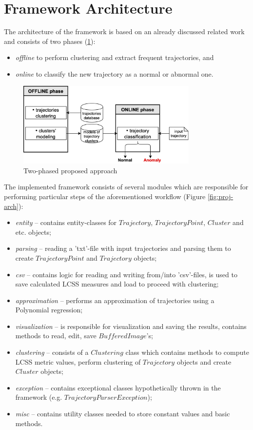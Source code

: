 \section{Framework Architecture}

The architecture of the framework is based on an already discussed related work \cite{inproceedings:7_related_work} and consists of two phases (\ref{fig:str}):

\begin{itemize}
	\item \textit{offline} to perform clustering and extract frequent trajectories, and
	\item \textit{online} to classify the new trajectory as a normal or abnormal one.
\end{itemize}

\begin{figure}[!htb]
	\centering{}
	\includegraphics[width=0.8\textwidth]{images/str.png}
	\caption{Two-phased proposed approach}
	\label{fig:str}
\end{figure}

The implemented framework consists of several modules which are responsible for performing particular steps of the aforementioned workflow (Figure \ref{fig:proj-arch}):
\begin{itemize}
	\setlength\itemsep{-0.2em}
	\item \textit{entity} -- contains entity-classes for $Trajectory$, $TrajectoryPoint$, $Cluster$ and etc. objects;
	\item \textit{parsing} -- reading a 'txt'-file with input trajectories and parsing them to create $TrajectoryPoint$ and $Trajectory$ objects;
	\item \textit{csv} -- contains logic for reading and writing from/into 'csv'-files, is used to save calculated LCSS measures and load to proceed with clustering;
	\item \textit{approximation} -- performs an approximation of trajectories using a Polynomial regression;
	\item \textit{visualization} -- is responsible for visualization and saving the results, contains methods to read, edit, save $BufferedImage$'s;
	\item \textit{clustering} -- consists of a $Clustering$ class which contains methods to compute LCSS metric values, perform clustering of $Trajectory$ objects and create $Cluster$ objects;
	\item \textit{exception} -- contains exceptional classes hypothetically thrown in the framework (e.g. $TrajectoryParserException$);
	\item \textit{misc} -- contains utility classes needed to store constant values and basic methods.
\end{itemize}

